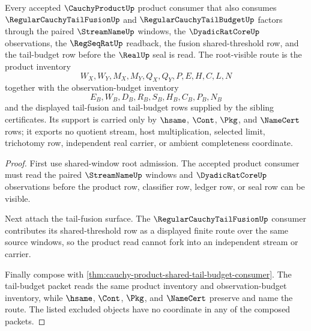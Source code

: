 \begin{theorem}
\label{thm:cauchy-product-tail-fusion-budget-route}
Every accepted $\CauchyProductUp$ product consumer that also consumes $\RegularCauchyTailFusionUp$ and $\RegularCauchyTailBudgetUp$ factors through the paired $\StreamNameUp$ windows, the $\DyadicRatCoreUp$ observations, the $\RegSeqRatUp$ readback, the fusion shared-threshold row, and the tail-budget row before the $\RealUp$ seal is read. The root-visible route is the product inventory
$$
W_X,W_Y,M_X,M_Y,Q_X,Q_Y,P,E,H,C,L,N
$$
together with the observation-budget inventory
$$
E_B,W_B,D_B,R_B,S_B,H_B,C_B,P_B,N_B
$$
and the displayed tail-fusion and tail-budget rows supplied by the sibling certificates. Its support is carried only by $\hsame$, $\Cont$, $\Pkg$, and $\NameCert$ rows; it exports no quotient stream, host multiplication, selected limit, trichotomy row, independent real carrier, or ambient completeness coordinate.
\end{theorem}
\begin{proof}
First use shared-window root admission. The accepted product consumer must read the paired $\StreamNameUp$ windows and $\DyadicRatCoreUp$ observations before the product row, classifier row, ledger row, or seal row can be visible.

Next attach the tail-fusion surface. The $\RegularCauchyTailFusionUp$ consumer contributes its shared-threshold row as a displayed finite route over the same source windows, so the product read cannot fork into an independent stream or carrier.

Finally compose with \autoref{thm:cauchy-product-shared-tail-budget-consumer}. The tail-budget packet reads the same product inventory and observation-budget inventory, while $\hsame$, $\Cont$, $\Pkg$, and $\NameCert$ preserve and name the route. The listed excluded objects have no coordinate in any of the composed packets.
\end{proof}

